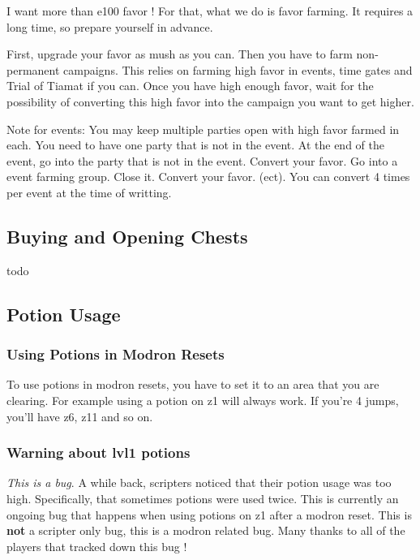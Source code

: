 \documentclass{article}
\begin{document}
I want more than e100 favor !
For that, what we do is favor farming.
It requires a long time, so prepare yourself in advance.

First, upgrade your favor as mush as you can.
Then you have to farm non-permanent campaigns.
This relies on farming high favor in events, time gates and Trial of Tiamat if you can.
Once you have high enough favor, wait for the possibility of converting this high favor into the campaign you want to get higher.

Note for events:
You may keep multiple parties open with high favor farmed in each.
You need to have one party that is not in the event.
At the end of the event, go into the party that is not in the event.
Convert your favor.
Go into a event farming group.
Close it.
Convert your favor.
(ect).
You can convert 4 times per event at the time of writting.





\subsection{Buying and Opening Chests}

todo

\subsection{Potion Usage}

\subsubsection{Using Potions in Modron Resets}

To use potions in modron resets, you have to set it to an area that you are clearing.
For example using a potion on z1 will always work.
If you're 4 jumps, you'll have z6, z11 and so on.

\subsubsection{Warning about lvl1 potions}

\emph{This is a bug}.\newline
A while back, scripters noticed that their potion usage was too high.
Specifically, that sometimes potions were used twice.
This is currently an ongoing bug that happens when using potions on z1 after a modron reset.
This is \textbf{not} a scripter only bug, this is a modron related bug.
Many thanks to all of the players that tracked down this bug !
\end{document}
